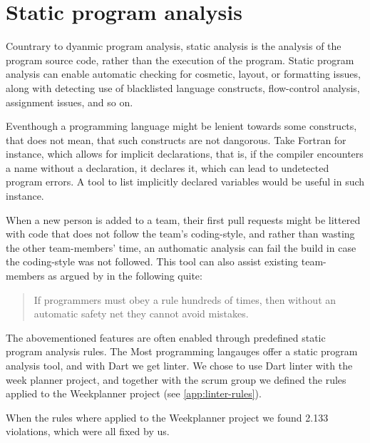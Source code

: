 \section{Static program analysis}

Countrary to dyanmic program analysis, static analysis is the analysis of the program source code, rather than the execution of the program\cite{wichmann_industrial_1995}. Static program analysis can enable automatic checking for cosmetic, layout, or formatting issues, along with detecting use of blacklisted language constructs, flow-control analysis, assignment issues, and so on\cite{wichmann_industrial_1995}. 

Eventhough a programming language might be lenient towards some constructs, that does not mean, that such constructs are not dangorous. Take Fortran for instance, which allows for implicit declarations, that is, if the compiler encounters a name without a declaration, it declares it, which can lead to undetected program errors\cite{wichmann_industrial_1995}. A tool to list implicitly declared variables would be useful in such instance.

When a new person is added to a team, their first pull requests might be littered with code that does not follow the team's coding-style, and rather than wasting the other team-members' time, an authomatic analysis can fail the build in case the coding-style was not followed. This tool can also assist existing team-members as argued by \cite{bessey_few_2010} in the following quite:

\begin{quote}
    If programmers must obey a rule hundreds of times, then without an automatic safety net they cannot avoid mistakes.\cite{bessey_few_2010}
\end{quote}

The abovementioned features are often enabled through predefined static program analysis rules\cite{bessey_few_2010}. The 
Most programming langauges offer a static program analysis tool, and with Dart we get linter\cite{dart_linter_2019}. We chose to use Dart linter with the week planner project, and together with the scrum group we defined the rules applied to the Weekplanner project (see \autoref{app:linter-rules}).

When the rules where applied to the Weekplanner project we found 2.133 violations, which were all fixed by us. 

